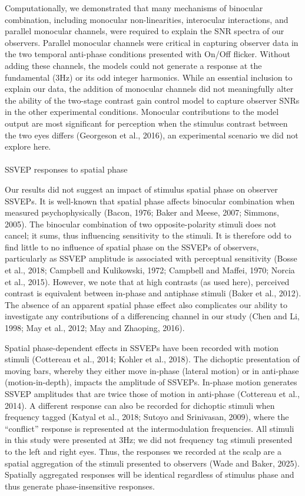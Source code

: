 \documentclass[review,
  12pt,
]{elsarticle}
\makeatletter
\let\oldparagraph\paragraph
\renewcommand{\paragraph}{
    \@ifstar
      \xxxParagraphStar
      \xxxParagraphNoStar
  }
\newcommand{\xxxParagraphStar}[1]{\oldparagraph*{#1}\mbox{}}
\newcommand{\xxxParagraphNoStar}[1]{\oldparagraph{#1}\mbox{}}
\makeatother
\begin{document}
Computationally, we demonstrated that many mechanisms of binocular
combination, including monocular non-linearities, interocular
interactions, and parallel monocular channels, were required to explain
the SNR spectra of our observers. Parallel monocular channels were
critical in capturing observer data in the two temporal anti-phase
conditions presented with On/Off flicker. Without adding these channels,
the models could not generate a response at the fundamental (3Hz) or its
odd integer harmonics. While an essential inclusion to explain our data,
the addition of monocular channels did not meaningfully alter the
ability of the two-stage contrast gain control model to capture observer
SNRs in the other experimental conditions. Monocular contributions to
the model output are most significant for perception when the stimulus
contrast between the two eyes differs (Georgeson et al., 2016), an
experimental scenario we did not explore here.

\paragraph{SSVEP responses to spatial
phase}\label{ssvep-responses-to-spatial-phase}

Our results did not suggest an impact of stimulus spatial phase on
observer SSVEPs. It is well-known that spatial phase affects binocular
combination when measured psychophysically (Bacon, 1976; Baker and
Meese, 2007; Simmons, 2005). The binocular combination of two
opposite-polarity stimuli does not cancel; it sums, thus influencing
sensitivity to the stimuli. It is therefore odd to find little to no
influence of spatial phase on the SSVEPs of observers, particularly as
SSVEP amplitude is associated with perceptual sensitivity (Bosse et al.,
2018; Campbell and Kulikowski, 1972; Campbell and Maffei, 1970; Norcia
et al., 2015). However, we note that at high contrasts (as used here),
perceived contrast is equivalent between in-phase and antiphase stimuli
(Baker et al., 2012). The absence of an apparent spatial phase effect
also complicates our ability to investigate any contributions of a
differencing channel in our study (Chen and Li, 1998; May et al., 2012;
May and Zhaoping, 2016).

Spatial phase-dependent effects in SSVEPs have been recorded with motion
stimuli (Cottereau et al., 2014; Kohler et al., 2018). The dichoptic
presentation of moving bars, whereby they either move in-phase (lateral
motion) or in anti-phase (motion-in-depth), impacts the amplitude of
SSVEPs. In-phase motion generates SSVEP amplitudes that are twice those
of motion in anti-phase (Cottereau et al., 2014). A different response
can also be recorded for dichoptic stimuli when frequency tagged (Katyal
et al., 2018; Sutoyo and Srinivasan, 2009), where the ``conflict''
response is represented at the intermodulation frequencies. All stimuli
in this study were presented at 3Hz; we did not frequency tag stimuli
presented to the left and right eyes. Thus, the responses we recorded at
the scalp are a spatial aggregation of the stimuli presented to
observers (Wade and Baker, 2025). Spatially aggregated responses will be
identical regardless of stimulus phase and thus generate
phase-insensitive responses.
\end{document}
